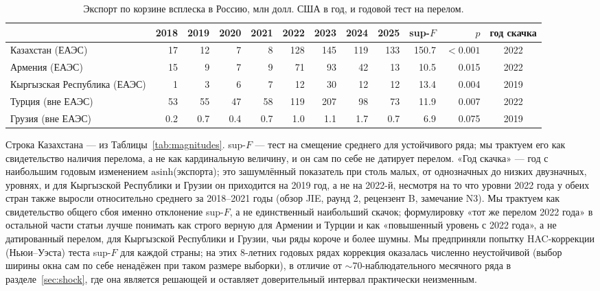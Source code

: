 \documentclass[12pt]{article}
\begin{document}
\begin{table}[htbp]
\centering
\caption{Экспорт по корзине всплеска в Россию, млн долл. США в год, и годовой тест на
перелом.}
\label{tab:appe}
\footnotesize
\setlength{\tabcolsep}{3.2pt}
\begin{tabular}{@{}lrrrrrrrrrrc@{}}
\toprule
& 2018 & 2019 & 2020 & 2021 & 2022 & 2023 & 2024 & 2025 & sup-$F$ & $p$ & год скачка \\
\midrule
Казахстан (ЕАЭС)        & 17 & 12 & 7 & 8 & 128 & 145 & 119 & 133 & 150.7 & $<0.001$ & 2022 \\
Армения (ЕАЭС)           & 15 & 9 & 7 & 9 & 71 & 93 & 42 & 13 & 10.5 & 0.015 & 2022 \\
Кыргызская Республика (ЕАЭС)   & 1 & 3 & 6 & 7 & 12 & 30 & 12 & 12 & 13.4 & 0.004 & 2019 \\
Турция (вне ЕАЭС)     & 53 & 55 & 47 & 58 & 119 & 207 & 98 & 73 & 11.9 & 0.007 & 2022 \\
Грузия (вне ЕАЭС)       & 0.2 & 0.7 & 0.4 & 0.7 & 1.0 & 1.1 & 1.7 & 0.7 & 6.9 & 0.075 & 2019 \\
\bottomrule
\end{tabular}

\vspace{2pt}
\footnotesize Строка Казахстана — из Таблицы~\ref{tab:magnitudes}. sup-$F$ — тест на
смещение среднего для устойчивого ряда; мы трактуем его как свидетельство наличия перелома,
а не как кардинальную величину, и он сам по себе не датирует перелом. «Год скачка» — год с
наибольшим годовым изменением $\text{asinh}$(экспорта); это зашумлённый показатель при
столь малых, от однозначных до низких двузначных, уровнях, и для Кыргызской Республики и
Грузии он приходится на 2019 год, а не на 2022-й, несмотря на то что уровни 2022 года у
обеих стран также выросли относительно среднего за 2018--2021 годы (обзор JIE, раунд 2,
рецензент B, замечание N3). Мы трактуем как свидетельство общего сбоя именно отклонение
sup-$F$, а не единственный наибольший скачок; формулировку «тот же перелом 2022 года» в
остальной части статьи лучше понимать как строго верную для Армении и Турции и как
«повышенный уровень с 2022 года», а не датированный перелом, для Кыргызской Республики и
Грузии, чьи ряды короче и более шумны. Мы предприняли попытку HAC-коррекции (Ньюи--Уэста)
теста sup-$F$ для каждой страны; на этих 8-летних годовых рядах коррекция оказалась
численно неустойчивой (выбор ширины окна сам по себе ненадёжен при таком размере выборки),
в отличие от $\sim$70-наблюдательного месячного ряда в разделе~\ref{sec:shock}, где она
является решающей и оставляет доверительный интервал практически неизменным.
\end{table}
\end{document}
